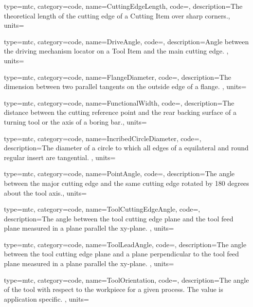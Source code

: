 {
  type=mtc,
  category=code,
  name={CuttingEdgeLength},
  code=,
  description={The theoretical length of the cutting edge of a Cutting Item over sharp corners.},
  units=
}

{
  type=mtc,
  category=code,
  name={DriveAngle},
  code=,
  description={Angle between the driving mechanism locator on a Tool Item and the main cutting edge. },
  units=
}

{
  type=mtc,
  category=code,
  name={FlangeDiameter},
  code=,
  description={The dimension between two parallel tangents on the outside edge of a flange. },
  units=
}

{
  type=mtc,
  category=code,
  name={FunctionalWidth},
  code=,
  description={The distance between the cutting reference point and the rear backing surface of a turning tool or the axis of a boring bar.},
  units=
}

{
  type=mtc,
  category=code,
  name={IncribedCircleDiameter},
  code=,
  description={The diameter of a circle to which all edges of a equilateral and round regular insert are tangential. },
  units=
}

{
  type=mtc,
  category=code,
  name={PointAngle},
  code=,
  description={The angle between the major cutting edge and the same cutting edge rotated by 180 degrees about the tool axis.},
  units=
}

{
  type=mtc,
  category=code,
  name={ToolCuttingEdgeAngle},
  code=,
  description={The angle between the tool cutting edge plane and the tool feed plane measured in a plane parallel the xy-plane. },
  units=
}

{
  type=mtc,
  category=code,
  name={ToolLeadAngle},
  code=,
  description={The angle between the tool cutting edge plane and a plane perpendicular to the tool feed plane measured in a plane parallel the xy-plane. },
  units=
}

{
  type=mtc,
  category=code,
  name={ToolOrientation},
  code=,
  description={The angle of the tool with respect to the workpiece for a given process. The value is application specific. },
  units=
}

